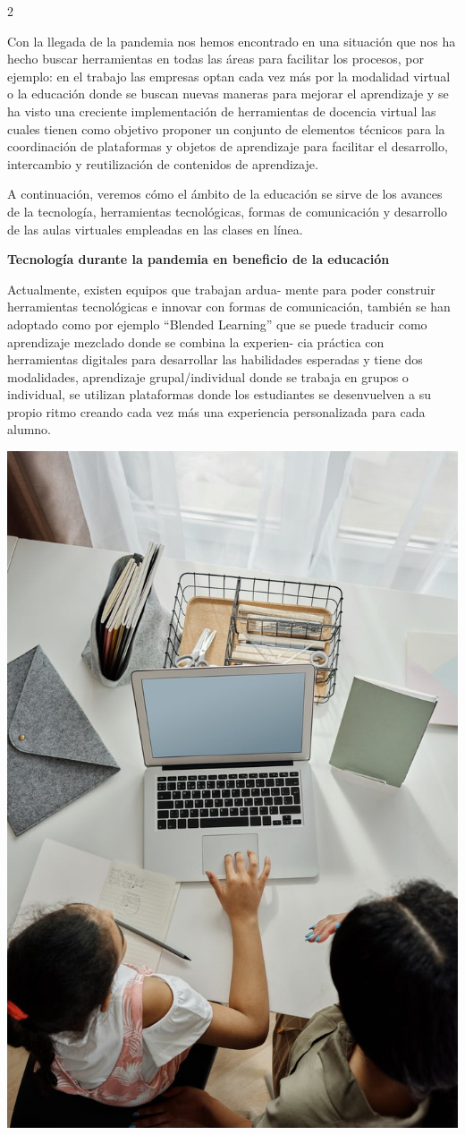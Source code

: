 \documentclass[12pt,spanish,Letterpaper,openany]{book}
\begin{document}
\begin {multicols}{2}

Con la llegada de la pandemia nos hemos encontrado en una situación que nos ha hecho buscar herramientas en todas las áreas para facilitar los procesos, por ejemplo: en el trabajo las empresas optan cada vez más por la modalidad virtual o la educación donde se buscan nuevas maneras para mejorar el aprendizaje y se ha visto una creciente implementación de herramientas de docencia virtual las cuales tienen como objetivo proponer un conjunto de elementos técnicos para la coordinación de plataformas y objetos de aprendizaje para facilitar el desarrollo, intercambio y reutilización de contenidos de aprendizaje.

A continuación, veremos cómo el ámbito de la educación se sirve de los avances de la tecnología, herramientas tecnológicas, formas de comunicación y desarrollo de las aulas virtuales empleadas en las clases en línea.

\textbf{Tecnología durante la pandemia en beneficio de la educación}

Actualmente, existen equipos que trabajan ardua-
mente para poder construir herramientas tecnológicas e innovar con formas de comunicación, también se han adoptado como por ejemplo ``Blended Learning'' que se puede traducir como aprendizaje mezclado donde se combina la experien-
cia práctica con herramientas digitales para desarrollar las habilidades esperadas y tiene dos modalidades, aprendizaje grupal/individual donde se trabaja en grupos o individual, se utilizan plataformas donde los estudiantes se desenvuelven a su propio ritmo creando cada vez más una experiencia personalizada para cada alumno.

\begin {flushleft}
\noindent\begin{minipage}[c]{\columnwidth}
\centering

\includegraphics[width=0.5\linewidth]{images/pareja33_image2}


\end{minipage}
\end{flushleft}
\end{multicols}
\end{document}
